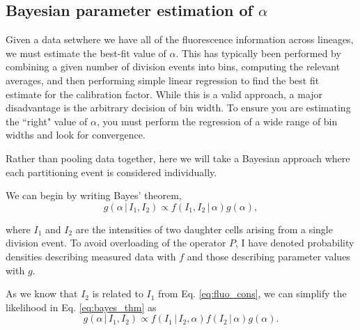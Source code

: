 \begin{figure}
\end{figure}


\subsection*{Bayesian parameter estimation of $\alpha$}
Given a data setwhere we have all of the fluorescence information across lineages,
we must estimate the best-fit value of $\alpha$. This has typically been performed
by combining a given number of division events into bins, computing the relevant
averages, and then performing simple linear regression to find the best fit estimate
for the calibration factor. While this is a valid approach, a major disadvantage
is the arbitrary decision of bin width. To ensure you are estimating the ``right"
value of $\alpha$, you must perform the regression of a wide range of bin widths
and look for convergence.

Rather than pooling data together, here we will take a Bayesian approach where
each partitioning event is considered individually.

We can begin by writing Bayes' theorem,
\begin{equation}
g(\alpha\, \vert \, I_1, I_2) \propto f(I_1, I_2 \,\vert\, \alpha) g(\alpha),
\label{eq:bayes_thm}
\end{equation}

where $I_1$ and $I_2$ are the intensities of two daughter cells arising from
a single division event. To avoid overloading of the operator $P$, I have denoted
probability densities describing measured data with $f$ and those describing
parameter values with $g$.

As we know that $I_2$ is related to $I_1$ from Eq. \ref{eq:fluo_cons}, we can
simplify the likelihood in Eq. \ref{eq:bayes_thm} as
\begin{equation}
g(\alpha \, \vert \, I_1, I_2) \propto f(I_1\, \vert\, I_2, \alpha) f(I_2 \, \vert\, \alpha) g(\alpha).
\end{equation}


